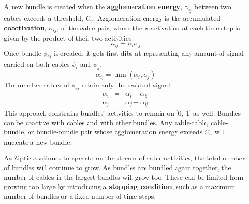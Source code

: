 A new bundle is created when the \textbf{agglomeration energy},
$\gamma_{ij}$
between two cables exceeds a threshold, $C_\gamma$. Agglomeration energy is the
accumulated \textbf{coactivation}, $\kappa_{ij}$, of the cable pair, where the
coactivation at each time step is given by the product of their two
activities.
\begin{equation}
\kappa_{ij} = \alpha_i \alpha_j
\end{equation}
Once bundle $\phi_{ij}$ is created, it gets first dibs at representing any
amount of signal carried on both cables $\phi_i$
and $\phi_j$.
\begin{equation}
\alpha_{ij} = \min(\alpha_i, \alpha_j)
\end{equation}
The member cables of $\phi_{ij}$  retain only the residual signal.
\begin{eqnarray}
\alpha_{\imath} &=& \alpha_i - \alpha_{ij}\\
\alpha_{\jmath} &=& \alpha_j - \alpha_{ij}
\end{eqnarray}
This approach constrains bundles' activities to remain on [0, 1] as well.
Bundles can be coactive with cables and with other bundles.
Any cable-cable, cable-bundle, or bundle-bundle pair whose
agglomeration energy exceeds $C_\gamma$ will nucleate
a new bundle.

As Ziptie continues to operate on the stream of cable activities,
the total number of bundles will continue to grow. As bundles are 
bundled again
together, the number of cables in the largest bundles will grow too.
These can be limited from growing too large by introducing
a \textbf{stopping condition}, such as
a maximum number of bundles or a fixed number of time steps.









